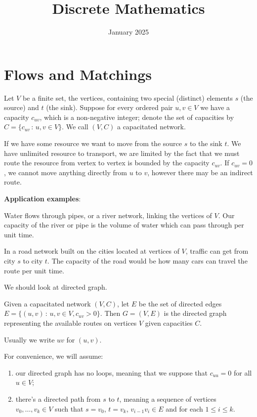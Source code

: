 \documentclass[10pt, a4paper]{article}
\title{Discrete Mathematics}
\author{}
\date{January 2025}
\begin{document}
\maketitle

\newpage

\section{Flows and Matchings}

\begin{definition}
    Let $V$ be a finite set,
    the vertices,
    containing two special
    (distinct)
    elements $s$
    (the source)
    and $t$
    (the sink).
    Suppose for every ordered pair $u, v \in V$ we have a capacity $c_{uv}$,
    which is a non-negative integer;
    denote the set of capacities by $C = \{c_{uv}\,:\,u, v \in V\}$.
    We call $(V, C)$ a capacitated network.
\end{definition}

If we have some resource we want to move from the source $s$ to the sink $t$.
We have unlimited resource to transport,
we are limited by the fact that we must route the resource from vertex to vertex is bounded by the capacity $c_{uv}$.
If $c_{uv} = 0$,
we cannot move anything directly from $u$ to $v$,
however there may be an indirect route.

\textbf{Application examples}:

Water flows through pipes,
or a river network,
linking the vertices of $V$.
Our capacity of the river or pipe is the volume of water which can pass through per unit time.

In a road network built on the cities located at vertices of $V$,
traffic can get from city $s$ to city $t$.
The capacity of the road would be how many cars can travel the route per unit time.


We should look at directed graph.

\begin{definition}
    Given a capacitated network $(V, C)$,
    let $E$ be the set of directed edges $E = \{(u, v)\,:\, u, v \in V, c_{uv} > 0\}$.
    Then $G = (V, E)$ is the directed graph representing the available routes on vertices $V$ given capacities $C$.
\end{definition}

Usually we write $uv$ for $(u, v)$.

For convenience,
we will assume:
\begin{enumerate}[label = (\roman*)]
    \item our directed graph has no loops,
    meaning that we suppose that $c_{uu} = 0$ for all $u \in V$;

    \item there's a directed path from $s$ to $t$,
    meaning a sequence of vertices $v_0, \dotsc, v_k \in V$ such that $s = v_0$,
    $t = v_k$,
    $v_{i - 1}v_i \in E$ and for each $1 \leq i \leq k$.
\end{enumerate}
\end{document}
